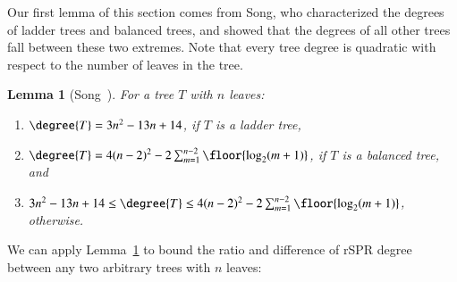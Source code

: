 \documentclass[]{elsarticle}
\newtheorem{lem}[thm]{Lemma}
\begin{document}
Our first lemma of this section comes from Song, who characterized the degrees of ladder trees and balanced trees, and showed that the degrees of all other trees fall between these two extremes.
Note that every tree degree is quadratic with respect to the number of leaves in the tree.

\begin{lem}[{Song~\citep{Song2003-gf}}]
	\label{lem:degree_extremes}
	For a tree $T$ with $n$ leaves:
	\begin{enumerate}
		\item $\degree{T} = 3n^2 - 13n + 14$, if $T$ is a ladder tree,
		\item $\degree{T} = 4(n-2)^2 - 2 \sum_{m=1}^{n-2} \floor{\log_2(m+1)}$, if $T$ is a balanced tree, and
		\item  $3n^2 - 13n + 14 \le \degree{T} \le 4(n-2)^2 - 2 \sum_{m=1}^{n-2} \floor{\log_2(m+1)}$, otherwise.
	\end{enumerate}
\end{lem}

We can apply Lemma~\ref{lem:degree_extremes} to bound the ratio and difference of rSPR degree between any two arbitrary trees with $n$ leaves:
\end{document}
